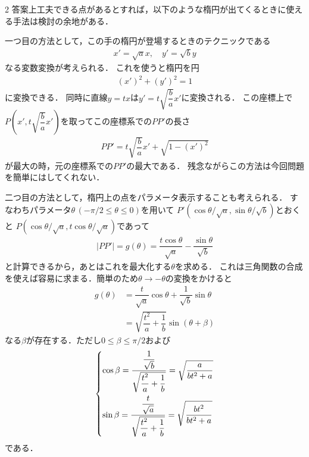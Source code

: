\documentclass[../../main.tex]{subfiles}
\begin{document}
\begin{multicols}{2}
  答案上工夫できる点があるとすれば，以下のような楕円が出てくるときに使える手法は検討の余地がある．


  一つ目の方法として，この手の楕円が登場するときのテクニックである
  \begin{align}
    x' = \sqrt{a}x,
    \quad
    y' = \sqrt{b}y
  \end{align}
  なる変数変換が考えられる．
  これを使うと楕円を円
  \begin{align}
    (x')^2+(y')^2=1
  \end{align}
  に変換できる．
  同時に直線$y=tx$は$y'=t\sqrt{\dfrac{b}{a}}x'$に変換される．
  この座標上で$P(x', t\sqrt{\dfrac{b}{a}}x')$を取ってこの座標系での$PP'$の長さ
  \begin{align}
    PP' = t\sqrt{\dfrac{b}{a}}x' + \sqrt{1-(x')^2}
  \end{align}
  が最大の時，元の座標系での$PP'$の最大である．
  残念ながらこの方法は今回問題を簡単にはしてくれない．

  二つ目の方法として，楕円上の点をパラメータ表示することも考えられる．
  すなわちパラメータ$\theta \, (-\pi/2 \le \theta \le 0)$を用いて
  $P'(\cos\theta/\sqrt{a},\sin\theta/\sqrt{b})$とおくと
  $P(\cos\theta/\sqrt{a},t\cos\theta/\sqrt{a})$であって
  \begin{align}
    |PP'| = g(\theta) = \dfrac{t\cos\theta}{\sqrt{a}} - \dfrac{\sin\theta}{\sqrt{b}}
  \end{align}
  と計算できるから，あとはこれを最大化する$\theta$を求める．
  これは三角関数の合成を使えば容易に求まる．簡単のため$\theta \to -\theta$の変換をかけると
  \begin{align}
    g(\theta)
    & = \dfrac{t}{\sqrt{a}}\cos\theta + \dfrac{1}{\sqrt{b}}\sin\theta     \\
    & = \sqrt{\dfrac{t^2}{a}+\dfrac{1}{b}}\sin\left(\theta + \beta\right)
  \end{align}
  なる$\beta$が存在する．ただし$0 \le \beta \le \pi/2$および
  \begin{align}
    \begin{dcases}
      \cos\beta = \dfrac{\dfrac{1}{\sqrt{b}}}{\sqrt{\dfrac{t^2}{a}+\dfrac{1}{b}}} = \sqrt{\dfrac{a}{bt^2+a}} \\
      \sin\beta = \dfrac{\dfrac{t}{\sqrt{a}}}{\sqrt{\dfrac{t^2}{a}+\dfrac{1}{b}}} = \sqrt{\dfrac{bt^2}{bt^2+a}}
    \end{dcases}
  \end{align}
  である．


\end{multicols}
\end{document}
